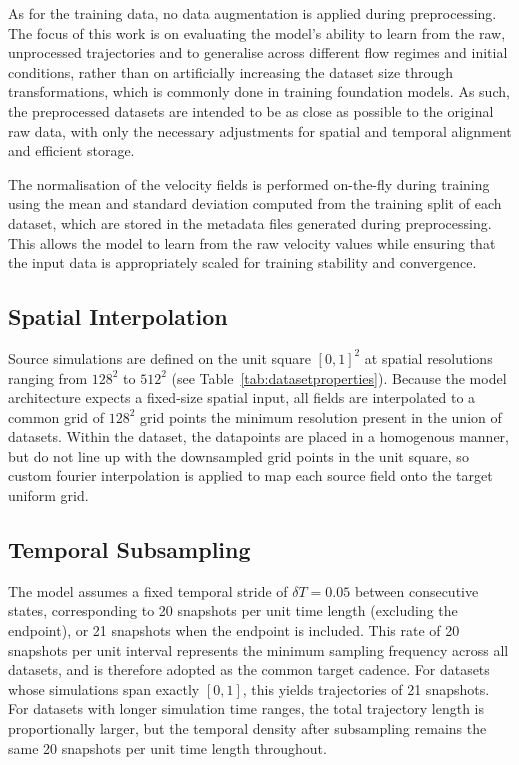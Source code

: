 As for the training data, no data augmentation is applied during preprocessing. The focus of this work is on evaluating the model's ability to learn from the raw, unprocessed trajectories and to generalise across different flow regimes and initial conditions, rather than on artificially increasing the dataset size through transformations, which is commonly done in training foundation models. As such, the preprocessed datasets are intended to be as close as possible to the original raw data, with only the necessary adjustments for spatial and temporal alignment and efficient storage.

The normalisation of the velocity fields is performed on-the-fly during training using the mean and standard deviation computed from the training split of each dataset, which are stored in the metadata files generated during preprocessing. This allows the model to learn from the raw velocity values while ensuring that the input data is appropriately scaled for training stability and convergence. 
 
\subsection{Spatial Interpolation}
\label{ss:spatialinterp}
 
Source simulations are defined on the unit square $[0,1]^2$ at spatial resolutions ranging from $128^2$ to $512^2$ (see Table~\ref{tab:datasetproperties}). Because the model architecture expects a fixed-size spatial input, all fields are interpolated to a common grid of $128^2$ grid points the minimum resolution present in the union of datasets. Within the dataset, the datapoints are placed in a homogenous manner, but do not line up with the downsampled grid points in the unit square, so custom fourier interpolation is applied to map each source field onto the target uniform grid.
 
\subsection{Temporal Subsampling}
\label{ss:temporalsamp}

The model assumes a fixed temporal stride of $\delta T = 0.05$ between consecutive states, corresponding to 20 snapshots per unit time length (excluding the endpoint), or 21 snapshots 
when the endpoint is included. This rate of 20 snapshots per unit interval represents the
minimum sampling frequency across all datasets, and is therefore adopted as the common target
cadence. For datasets whose simulations span exactly $[0, 1]$, this yields trajectories of
21 snapshots. For datasets with longer simulation time ranges, the total trajectory length is
proportionally larger, but the temporal density after subsampling remains the same 20
snapshots per unit time length throughout.


